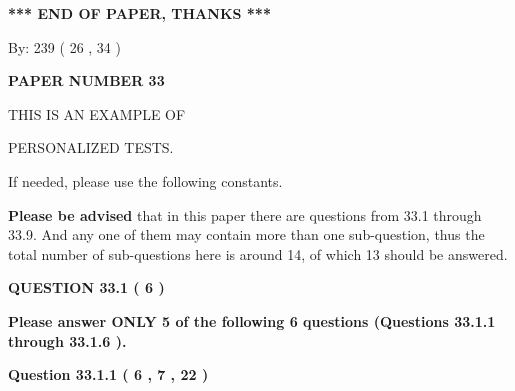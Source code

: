 \documentclass[12pt]{article}
\begin{document}
   
   
   
   
\vspace{1.0in} 
{\textbf{\large{ *** END OF PAPER, THANKS *** }}} 
   
   
\hspace{1.0in} By: 
         239 (          26 ,           34 )
   
   
   
   
\newpage 
\setcounter{page}{ 
    33001 } 
   
   
   
   
 {\textbf{ \Large{ PAPER NUMBER           33  }}}
   
   
\vspace{0.2in}
   
   
   
   
   
   
 \vspace{0.2in}
 
 
{\Huge  THIS IS AN EXAMPLE OF}
 
{\Huge  PERSONALIZED TESTS. }
 
If needed, please use the following constants.
 
 
 
{\textbf{\large{Please be advised}}} that in this paper there are questions from
33.1 through
33.9.
And any one of them may contain more than one sub-question, thus the total number
of sub-questions here is around 14, of which
13 should be answered.
 
\vspace{0.3in}
 
 
   
   
  
\vspace{0.2in}
  
{\textbf{\Large{QUESTION
33.1 
 (           6 )
}}}
  
  
{\textbf{\Large{Please answer ONLY  %
           5  %
 of the following  %
           6  %
 questions (Questions  %
33.1.1 %
 through  %
33.1.6 %
 ). }}}
   
   
  
\vspace{0.2in}
  
{\textbf{\Large{Question
33.1.1 
 (           6 ,           7 ,          22 )
}}}
  
  
 
\end{document}
